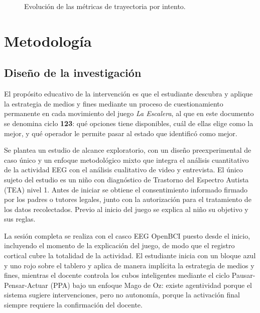 \documentclass{book}
\begin{document}
\begin{figure}[H]
\centering
{}
\caption{Evolución de las métricas de trayectoria por intento.}
\label{fig:grafica_metricas}
\end{figure}







\chapter{Metodología}

\section{Diseño de la investigación}
\label{sec:diseno-investigacion}

El propósito educativo de la intervención es que el estudiante descubra y aplique la estrategia de medios y fines mediante un proceso de cuestionamiento permanente en cada movimiento del juego \textit{La Escalera}, al que en este documento se denomina ciclo \textbf{123}: qué opciones tiene disponibles, cuál de ellas elige como la mejor, y qué operador le permite pasar al estado que identificó como mejor.

Se plantea un estudio de alcance exploratorio, con un diseño preexperimental de caso único y un enfoque metodológico mixto que integra el análisis cuantitativo de la actividad EEG con el análisis cualitativo de video y entrevista. El único sujeto del estudio es un niño con diagnóstico de Trastorno del Espectro Autista (TEA) nivel 1. Antes de iniciar se obtiene el consentimiento informado firmado por los padres o tutores legales, junto con la autorización para el tratamiento de los datos recolectados. Previo al inicio del juego se explica al niño su objetivo y sus reglas.

La sesión completa se realiza con el casco EEG OpenBCI puesto desde el inicio, incluyendo el momento de la explicación del juego, de modo que el registro cortical cubre la totalidad de la actividad. El estudiante inicia con un bloque azul y uno rojo sobre el tablero y aplica de manera implícita la estrategia de medios y fines, mientras el docente controla los cubos inteligentes mediante el ciclo Pausar-Pensar-Actuar (PPA) bajo un enfoque Mago de Oz: existe agentividad porque el sistema sugiere intervenciones, pero no autonomía, porque la activación final siempre requiere la confirmación del docente.
\end{document}
